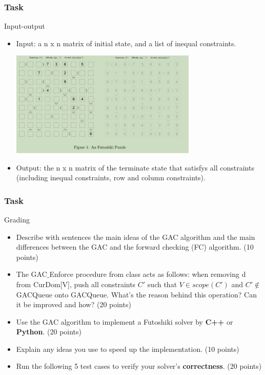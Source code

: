 \documentclass{beamer}
\begin{document}
\begin{frame}
  \frametitle{Task}
  \begin{block}{Input-output}
    \begin{itemize}
      \item Input: a n x n matrix of initial state, and a list of inequal constraints.


	  \includegraphics[width=0.7\textwidth]{Pic/figure1}

      \item Output: the n x n matrix of the terminate state that satisfys all constraints (including inequal constraints, row and column constraints).
    \end{itemize}
  \end{block}
\end{frame}
\begin{frame}

  \frametitle{Task}

  \begin{block}{Grading}
    \begin{itemize}
      \item Describe with sentences the main ideas of the GAC algorithm and the main differences between the GAC and the forward checking (FC) algorithm. (10 points)
\item %

     The GAC$\_$Enforce procedure from class acts as follows: when removing d from CurDom[V], push all constraints $C'$ such that $V\in scope(C')$ and $C'\not\in$ GACQueue onto GACQueue. What's the reason behind this operation? Can it be improved and how? (20 points)

\item Use the GAC algorithm to implement a Futoshiki solver by \textbf{C++} or \textbf{Python}. (20 points)
\item Explain any ideas you use to speed up the implementation. (10 points)
\item Run the following 5 test cases to verify your solver's \textbf{correctness}. (20 points)

    \end{itemize}
  \end{block}
\end{frame}
\end{document}
